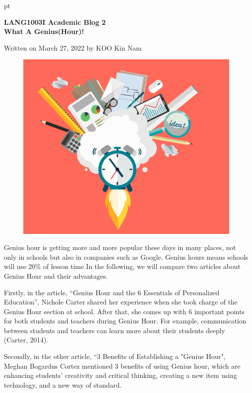 \documentclass[12pt]{article}
\begin{document}
 pt
\begin{center}
{\bf \Large LANG1003I Academic Blog 2\\What A Genius(Hour)!}
\end{center}
\vspace{0.3cm}
Written on March 27, 2022 by KOO Kin Nam\\


\begin{figure}
\includegraphics[scale = 0.2]{Photo2}
\end{figure}


Genius hour is getting more and more popular these days in many places, not only in schools but also in companies such as Google. Genius hours means schools will use 20\% of lesson time In the following, we will compare two articles about Genius Hour and their advantages.

Firstly, in the article, “Genius Hour and the 6 Essentials of Personalized Education”, Nichole Carter shared her experience when she took charge of the Genius Hour section at school. After that, she comes up with 6 important points for both students and teachers during Genius Hour. For example, communication between students and teachers can learn more about their students deeply (Carter, 2014).

Secondly, in the other article, “3 Benefits of Establishing a "Genius Hour", Meghan Bogardus Cortez mentioned 3 benefits of using Genius hour, which are enhancing students' creativity and critical thinking, creating a new item using technology, and a new way of standard.
\end{document}
